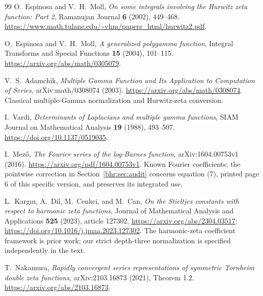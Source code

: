 \documentclass[11pt]{article}
\numberwithin{equation}{section}
\theoremstyle{plain}
\theoremstyle{definition}
\theoremstyle{remark}
\begin{document}
\begin{thebibliography}{99}
O.~Espinosa and V.~H.~Moll,
\emph{On some integrals involving the Hurwitz zeta function: Part 2},
Ramanujan Journal \textbf{6} (2002), 449--468.
\url{https://www.math.tulane.edu/~vhm/papers_html/hurwitz2.pdf}.

O.~Espinosa and V.~H.~Moll,
\emph{A generalized polygamma function},
Integral Transforms and Special Functions \textbf{15} (2004), 101--115.
\url{https://arxiv.org/abs/math/0305079}.

V.~S.~Adamchik,
\emph{Multiple Gamma Function and Its Application to Computation of Series},
arXiv:math/0308074 (2003).
\url{https://arxiv.org/abs/math/0308074}.
Classical multiple-Gamma normalization and Hurwitz-zeta conversion.

I.~Vardi,
\emph{Determinants of Laplacians and multiple gamma functions},
SIAM Journal on Mathematical Analysis \textbf{19} (1988), 493--507.
\url{https://doi.org/10.1137/0519035}.

I.~Mez\H{o},
\emph{The Fourier series of the log-Barnes function},
arXiv:1604.00753v1 (2016).
\url{https://arxiv.org/pdf/1604.00753v1}.
Known Fourier coefficients; the pointwise correction in
Section~\ref{bhr:sec:audit} concerns equation (7), printed page 6 of this
specific version, and preserves its integrated use.

L.~Karg\i n, A.~Dil, M.~Cenkci, and M.~Can,
\emph{On the Stieltjes constants with respect to harmonic zeta functions},
Journal of Mathematical Analysis and Applications \textbf{525} (2023),
article 127302.
\url{https://arxiv.org/abs/2304.03517};
\url{https://doi.org/10.1016/j.jmaa.2023.127302}.
The harmonic-zeta coefficient framework is prior work; our strict
depth-three normalization is specified independently in the text.

T.~Nakamura,
\emph{Rapidly convergent series representations of symmetric Tornheim
double zeta functions}, arXiv:2103.16873 (2021), Theorem 1.2.
\url{https://arxiv.org/abs/2103.16873}.

\end{thebibliography}

\end{document}
